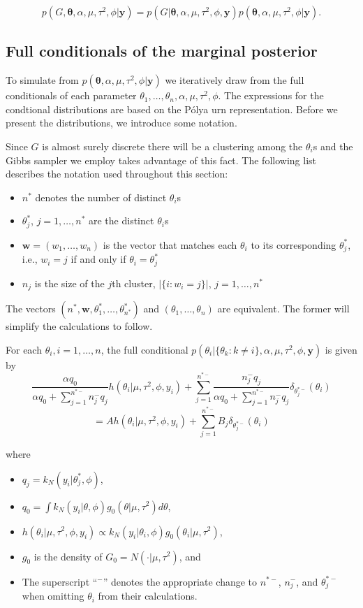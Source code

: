 \documentclass[12pt]{article}
\newcommand{\m}[1]{\mathbf{\bm{#1}}}
\begin{document}
\[ p(G,\m{\theta},\alpha,\mu,\tau^2,\phi|\m{y}) = p(G|\m{\theta},\alpha,\mu,\tau^2,\phi,\m{y})p(\m{\theta},\alpha,\mu,\tau^2,\phi|\m{y}). \]

\subsection*{Full conditionals of the marginal posterior}

\noindent To simulate from $p(\m{\theta},\alpha,\mu,\tau^2,\phi|\m{y})$ we iteratively draw from the full conditionals of each parameter $\theta_1,\ldots,\theta_n,\alpha,\mu,\tau^2,\phi$. The expressions for the condtional distributions are based on the P{\'o}lya urn representation. Before we present the distributions, we introduce some notation.

Since $G$ is almost surely discrete there will be a clustering among the $\theta_i$s and the Gibbs sampler we employ takes advantage of this fact. The following list describes the notation used throughout this section:
\begin{itemize}[label=$\cdot$]
\item $n^*$ denotes the number of distinct $\theta_i$s
\item $\theta_j^*$, $j=1,\ldots,n^*$ are the distinct $\theta_i$s
\item $\m{w}=(w_1,\ldots,w_n)$ is the vector that matches each $\theta_i$ to its corresponding $\theta_j^*$, i.e., $w_i=j$ if and only if $\theta_i=\theta_j^*$
\item $n_j$ is the size of the $j$th cluster, $|\{i:w_i=j\}|$, $j=1,\ldots,n^*$
\end{itemize}

\noindent The vectors $(n^*, \m{w}, \theta_1^*,\ldots,\theta_{n^*}^*)$ and $(\theta_1,\ldots,\theta_n)$ are equivalent. The former will simplify the calculations to follow.

For each $\theta_i, i=1,\ldots,n$, the full conditional $p(\theta_i|\{\theta_k:k\neq i\},\alpha,\mu,\tau^2,\phi,\m{y})$ is given by
\[ \frac{\alpha q_0}{\alpha q_0 + \sum_{j=1}^{n^{*-}} n_j^-q_j}h(\theta_i|\mu,\tau^2,\phi,y_i)+\sum_{j=1}^{n^{*-}}\frac{n_j^-q_j}{\alpha q_0 + \sum_{j=1}^{n^{*-}}n_j^-q_j}\delta_{\theta_j^{*-}}(\theta_i) \]
\[ =Ah(\theta_i|\mu,\tau^2,\phi,y_i)+\sum_{j=1}^{n^{*-}}B_j \delta_{\theta_j^{*-}}(\theta_i) \]

\noindent where
\begin{itemize}[label=$\cdot$]
\item $q_j=k_N(y_i|\theta_j^*,\phi)$,
\item $q_0=\int k_N(y_i|\theta,\phi)g_0(\theta|\mu,\tau^2)d\theta$,
\item $h(\theta_i|\mu,\tau^2,\phi,y_i) \propto k_N(y_i|\theta_i,\phi)g_0(\theta_i|\mu,\tau^2)$,
\item $g_0$ is the density of $G_0=N(\cdot|\mu,\tau^2)$, and
\item The superscript ``$^-$'' denotes the appropriate change to $n^{*-}$, $n_j^-$, and $\theta_j^{*-}$ when omitting $\theta_i$ from their calculations.
\end{itemize}
\end{document}
